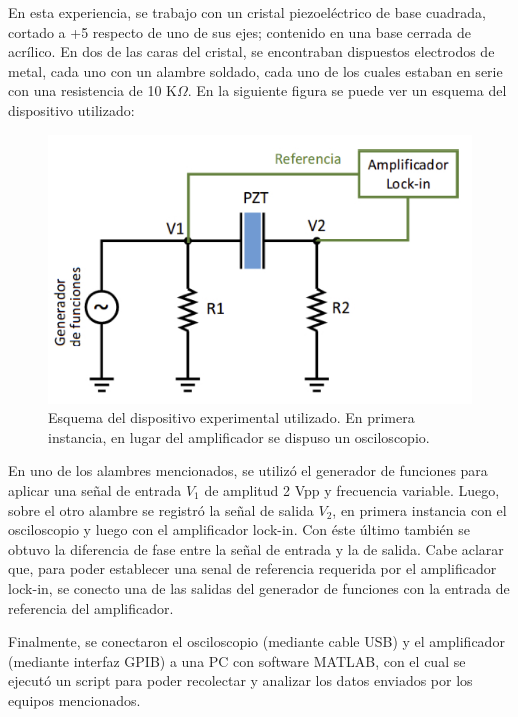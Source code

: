 \documentclass[twoside,twocolumn,a4paper]{article}
\begin{document}
En esta experiencia, se trabajo con un cristal piezoel\'ectrico de base cuadrada, cortado a +5 \degree respecto de uno de sus ejes; contenido en una base cerrada de acr\'ilico. En dos de las caras del cristal, se encontraban dispuestos electrodos de metal, cada uno con un alambre soldado, cada uno de los cuales estaban en serie con una resistencia de 10 K$\Omega$. En la siguiente figura se puede ver un esquema del dispositivo utilizado:

\begin{figure}[H]
\includegraphics[width=\linewidth]{dispexp.jpg}
\caption{Esquema del dispositivo experimental utilizado. En primera instancia, en lugar del amplificador se dispuso un osciloscopio.}
\label{fig:dispexp}
\end{figure}

En uno de los alambres mencionados, se utiliz\'o el generador de funciones para aplicar una se\~nal de entrada $V_{1}$ de amplitud 2 Vpp y frecuencia variable. Luego, sobre el otro alambre se registr\'o la se\~nal de salida $V_{2}$, en primera instancia con el osciloscopio y luego con el amplificador lock-in. Con \'este \'ultimo tambi\'en se obtuvo la diferencia de fase entre la se\~nal de entrada y la de salida. Cabe aclarar que, para poder establecer una senal de referencia requerida por el amplificador lock-in, se conecto una de las salidas del generador de funciones con la entrada de referencia del amplificador.


Finalmente, se conectaron el osciloscopio (mediante cable USB) y el amplificador (mediante interfaz GPIB) a una PC con software MATLAB,    con el cual se ejecut\'o un script para poder recolectar y analizar los datos enviados por los equipos mencionados.

\end{document}
